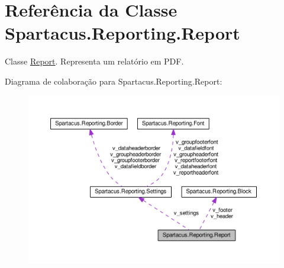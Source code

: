 \hypertarget{classSpartacus_1_1Reporting_1_1Report}{\section{Referência da Classe Spartacus.\+Reporting.\+Report}
\label{classSpartacus_1_1Reporting_1_1Report}
}


Classe \hyperlink{classSpartacus_1_1Reporting_1_1Report}{Report}. Representa um relatório em P\+D\+F.  




Diagrama de colaboração para Spartacus.\+Reporting.\+Report\+:\nopagebreak
\begin{figure}[H]
\begin{center}
\leavevmode
\includegraphics[width=350pt]{classSpartacus_1_1Reporting_1_1Report__coll__graph}
\end{center}
\end{figure}
